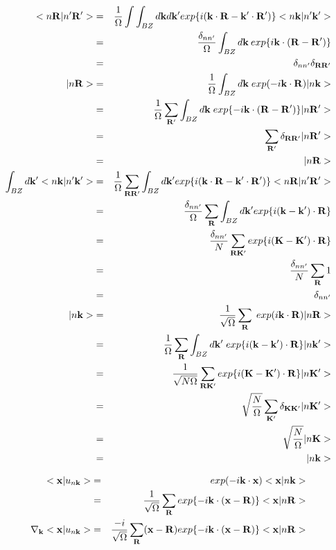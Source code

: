 \documentclass[aps,prb,preprint]{revtex4-1}
\begin{document}
\begin{appendix}
\begin{eqnarray}
< n{\bf R}|n'{\bf R'}> &=& \frac{1}{\Omega}  \int \int_{BZ} d{\bf k} d{\bf k'} exp\{i({\bf k} \cdot {\bf R} -{\bf k'} \cdot {\bf R'})\}<n{\bf k}|n'{\bf k'}>  \nonumber \\
&=& \frac{\delta_{nn'}}{\Omega} \int_{BZ} d{\bf k} \: exp\{i{\bf k} \cdot ({\bf R-R'})\}  \nonumber \\
&=& \delta_{nn'}\delta_{\bf RR'} \\
%
|n{\bf R}>&=&\frac{1}{\Omega} \int_{BZ} d{\bf k} \; exp(-i{\bf k} \cdot {\bf R})|n{\bf k}> \nonumber \\
&=&\frac{1}{\Omega} \sum_{\bf R'} \int_{BZ} d{\bf k} \; exp\{-i{\bf k} \cdot ({\bf R-R'}) \}|n{\bf R'}>\nonumber \\
&=&\sum_{\bf R'} \delta_{\bf RR'} |n{\bf R'}>\nonumber \\
&=& |n{\bf R}> \\
%
\int_{BZ} d{\bf k'} < n{\bf k}|n'{\bf k'}> &=& \frac{1}{\Omega} \sum_{\bf RR'} \int_{BZ} d{\bf k'}  exp\{i({\bf k}\cdot{\bf R}-{\bf k'} \cdot {\bf R'})\}<n{\bf R}|n'{\bf R'}>  \nonumber \\
&=& \frac{\delta_{nn'}}{\Omega}\sum_{\bf R} \int_{BZ} d{\bf k'}  exp\{i({\bf k - k'})\cdot {\bf R}\} \nonumber \\
&=& \frac{\delta_{nn'}}{N}\sum_{\bf RK'} exp\{i({\bf K - K'})\cdot {\bf R}\} \nonumber \\
&=& \frac{\delta_{nn'}}{N}\sum_{\bf R} 1 \nonumber \\
&=& \delta_{nn'} \\
%
|n{\bf k}>&=&\frac{1}{\sqrt{\Omega}} \sum_{\bf R} \; exp(i{\bf k} \cdot {\bf R}) |n{\bf R}> \nonumber \\
&=&\frac{1}{\Omega} \sum_{\bf R} \int_{BZ} d{\bf k'} \; exp\{i({\bf k-k'}) \cdot {\bf R} \}|n{\bf k'}>\nonumber \\
&=& \frac{1}{\sqrt{N \Omega}} \sum_{\bf RK'} exp\{i({\bf K - K'})\cdot {\bf R}\}|n{\bf K'}>\nonumber \\
&=& \sqrt{\frac{N}{\Omega}} \sum_{\bf K'} \delta_{\bf KK'} |n{\bf K'}>\nonumber \\
&=& \sqrt{\frac{N}{\Omega}} |n{\bf K}>\nonumber \\
&=&|n{\bf k}>
\end{eqnarray} 

\begin{eqnarray}
 < {\bf x}|u_{n{\bf k}}> &=& exp(-i{\bf k} \cdot {\bf x} )< {\bf x}|n{\bf k}> \nonumber \\
&=& \frac{1}{\sqrt{\Omega}} \sum_{\bf R} exp\{-i{\bf k} \cdot ({\bf x-R} )\}< {\bf x} |n{\bf R}> \\
 \nabla_{\bf k} < {\bf x}|u_{n{\bf k}}> &=& \frac{-i}{\sqrt{\Omega}} \sum_{\bf R} ({\bf x-R}) exp\{-i{\bf k} \cdot ({\bf x-R} )\}< {\bf x} |n{\bf R}>
\end{eqnarray} 



\end{appendix}
\end{document}
